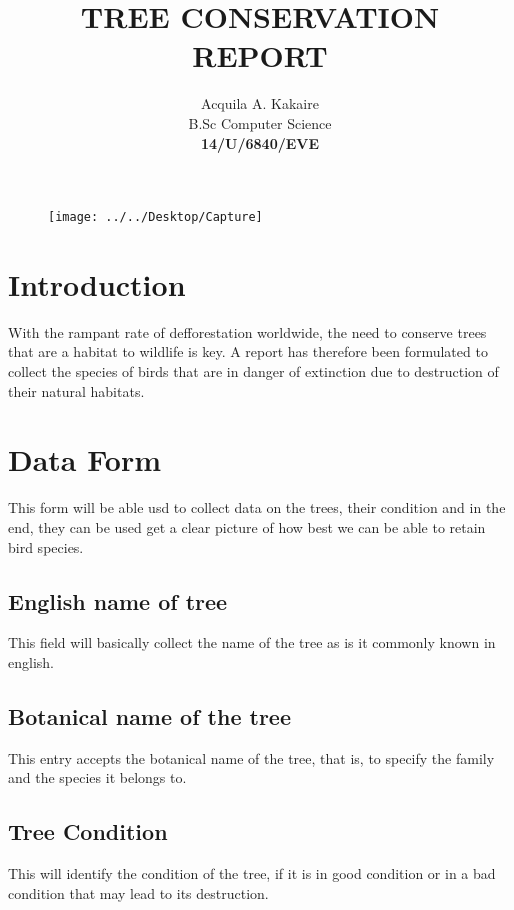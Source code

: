 \documentclass[10pt,a4paper]{report}
\begin{document}
	\begin{titlepage}
		\centering
		\begin{figure}
			\centering
			\texttt{[image: ../../Desktop/Capture]}
		\end{figure}
	\title{\textbf{TREE CONSERVATION REPORT}}
		\vfill
		\author{Acquila A. Kakaire
		\\B.Sc Computer Science
		\vspace{1.5cm}
		\\\textbf{14/U/6840/EVE}}
		
	\maketitle
	\end{titlepage}

\section{Introduction}
With the rampant rate of defforestation worldwide, the need to conserve trees that are a habitat to wildlife is key. A report has therefore been formulated to collect the species of birds that are in danger of extinction due to destruction of their natural habitats.

\section{Data Form}
This form will be able usd to collect data on the trees, their condition and in the end, they can be used get a clear picture of how  best we can be able to retain bird species.

\subsection{English name of tree}
This field will basically collect the name of the tree as is it commonly known in english.

\subsection {Botanical name of the tree}
This entry accepts the botanical name of the tree, that is, to specify the family and the species it belongs to.

\subsection {Tree Condition}
This will identify the condition of the tree, if it is in good condition or in a bad condition that may lead to its destruction.
\end{document}
